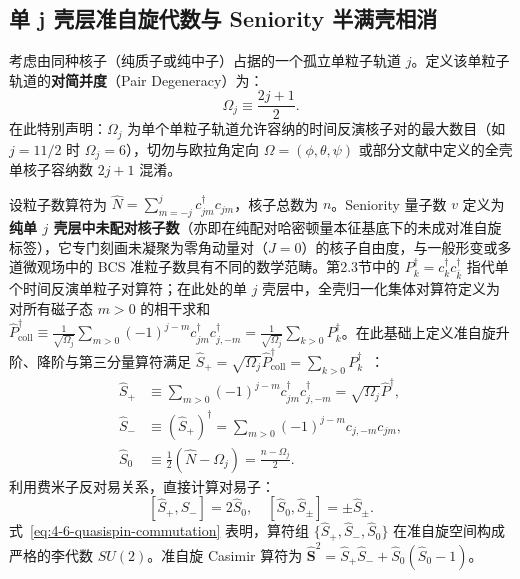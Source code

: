 \subsection{单 j 壳层准自旋代数与 Seniority 半满壳相消}\label{sec:4-6-1}

考虑由同种核子（纯质子或纯中子）占据的一个孤立单粒子轨道 $j$。定义该单粒子轨道的\textbf{对简并度}（Pair Degeneracy）为：
\begin{equation}\label{eq:4-6-pair-degeneracy}
\Omega_j \equiv \frac{2j + 1}{2}.
\end{equation}
在此特别声明：$\Omega_j$ 为单个单粒子轨道允许容纳的时间反演核子对的最大数目（如 $j=11/2$ 时 $\Omega_j = 6$），切勿与欧拉角定向 $\Omega = (\phi, \theta, \psi)$ 或部分文献中定义的全壳单核子容纳数 $2j+1$ 混淆。

设粒子数算符为 $\hat{N} = \sum_{m=-j}^j c_{jm}^\dagger c_{jm}$，核子总数为 $n$。Seniority 量子数 $v$ 定义为\textbf{纯单 $j$ 壳层中未配对核子数}（亦即在纯配对哈密顿量本征基底下的未成对准自旋标签），它专门刻画未凝聚为零角动量对（$J=0$）的核子自由度，与一般形变或多道微观场中的 BCS 准粒子数具有不同的数学范畴。第2.3节中的 $P_k^\dagger = c_k^\dagger c_{\bar{k}}^\dagger$ 指代单个时间反演单粒子对算符；在此处的单 $j$ 壳层中，全壳归一化集体对算符定义为对所有磁子态 $m>0$ 的相干求和 $\hat{P}_{\mathrm{coll}}^\dagger \equiv \frac{1}{\sqrt{\Omega_j}} \sum_{m>0} (-1)^{j-m} c_{jm}^\dagger c_{j,-m}^\dagger = \frac{1}{\sqrt{\Omega_j}} \sum_{k>0} P_k^\dagger$。在此基础上定义准自旋升阶、降阶与第三分量算符满足 $\hat{S}_+ = \sqrt{\Omega_j} \hat{P}_{\mathrm{coll}}^\dagger = \sum_{k>0} P_k^\dagger$~\cite{book-jain-nuclear-isomers}：
\begin{align}
\hat{S}_+ &\equiv \sum_{m>0} (-1)^{j-m} c_{jm}^\dagger c_{j,-m}^\dagger = \sqrt{\Omega_j} \hat{P}^\dagger, \label{eq:4-6-Splus-def}\\
\hat{S}_- &\equiv (\hat{S}_+)^\dagger = \sum_{m>0} (-1)^{j-m} c_{j,-m} c_{jm}, \label{eq:4-6-Sminus-def}\\
\hat{S}_0 &\equiv \frac{1}{2} \left( \hat{N} - \Omega_j \right) = \frac{n - \Omega_j}{2}. \label{eq:4-6-Szero-def}
\end{align}
利用费米子反对易关系，直接计算对易子：
\begin{equation}\label{eq:4-6-quasispin-commutation}
[\hat{S}_+, \hat{S}_-] = 2 \hat{S}_0, \quad [\hat{S}_0, \hat{S}_\pm] = \pm \hat{S}_\pm.
\end{equation}
式~\eqref{eq:4-6-quasispin-commutation} 表明，算符组 $\{\hat{S}_+, \hat{S}_-, \hat{S}_0\}$ 在准自旋空间构成严格的李代数 $SU(2)$。准自旋 Casimir 算符为 $\hat{\mathbf{S}}^2 = \hat{S}_+ \hat{S}_- + \hat{S}_0(\hat{S}_0 - 1)$。

